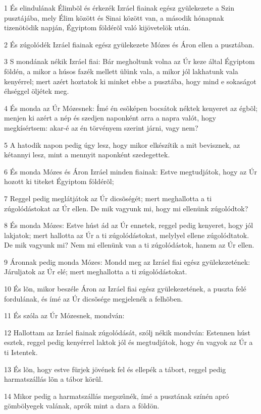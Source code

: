 \par 1 És elindulának Élimbõl és érkezék Izráel fiainak egész gyülekezete a Szin pusztájába, mely Élim között és Sinai között van, a második hónapnak tizenötödik napján, Égyiptom földérõl való kijövetelök után.
\par 2 És zúgolódék Izráel fiainak egész gyülekezete Mózes és Áron ellen a pusztában.
\par 3 S mondának nékik Izráel fiai: Bár megholtunk volna az Úr keze által Égyiptom földén, a mikor a húsos fazék mellett ülünk vala, a mikor jól lakhatunk vala kenyérrel; mert azért hoztatok ki minket ebbe a pusztába, hogy mind e sokaságot éhséggel öljétek meg.
\par 4 És monda az Úr Mózesnek: Ímé én esõképen bocsátok néktek kenyeret az égbõl; menjen ki azért a nép és szedjen naponként arra a napra valót, hogy megkísértsem: akar-é az én törvényem szerint járni, vagy nem?
\par 5 A hatodik napon pedig úgy lesz, hogy mikor elkészítik a mit bevisznek, az kétannyi lesz, mint a mennyit naponként szedegettek.
\par 6 És monda Mózes és Áron Izráel minden fiainak: Estve megtudjátok, hogy az Úr hozott ki titeket Égyiptom földérõl;
\par 7 Reggel pedig meglátjátok az Úr dicsõségét; mert meghallotta a ti zúgolódástokat az Úr ellen. De mik vagyunk mi, hogy mi ellenünk zúgolódtok?
\par 8 És monda Mózes: Estve húst ád az Úr ennetek, reggel pedig kenyeret, hogy jól lakjatok; mert hallotta az Úr a ti zúgolódástokat, melylyel ellene zúgolódtatok. De mik vagyunk mi? Nem mi ellenünk van a ti zúgolódástok, hanem az Úr ellen.
\par 9 Áronnak pedig monda Mózes: Mondd meg az Izráel fiai egész gyülekezetének: Járuljatok az Úr elé; mert meghallotta a ti zúgolódástokat.
\par 10 És lõn, mikor beszéle Áron az Izráel fiai egész gyülekezetének, a puszta felé fordulának, és ímé az Úr dicsõsége megjelenék a felhõben.
\par 11 És szóla az Úr Mózesnek, mondván:
\par 12 Hallottam az Izráel fiainak zúgolódását, szólj nékik mondván: Estennen húst esztek, reggel pedig kenyérrel laktok jól és megtudjátok, hogy én vagyok az Úr a ti Istentek.
\par 13 És lõn, hogy estve fürjek jövének fel és ellepék a tábort, reggel pedig harmatszállás lõn a tábor körûl.
\par 14 Mikor pedig a harmatszállás megszûnék, ímé a pusztának színén apró gömbölyegek valának, aprók mint a dara a földön.
